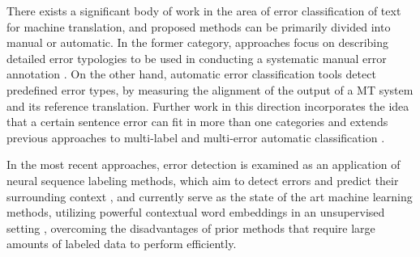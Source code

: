 
There exists a significant body of work in the area of error classification of text for machine translation, and proposed methods can be primarily divided into manual or automatic. In the former category, approaches focus on describing detailed error typologies to be used in conducting a systematic manual error annotation \cite{fishel2011automatic,vilar2006error, lommel2014multidimensional, farrus2010linguistic, costa2015linguistically}. On the other hand,  automatic error classification tools \cite{zeman2011addicter, popovic2011hjerson,popovic2015poor} detect predefined error types, by measuring the alignment of the output of a MT system and its reference translation. Further work in this direction incorporates the idea that a certain sentence error can fit in more than one categories \cite{klubivcka2018quantitative, lommel2014assessing} and extends previous approaches to multi-label and multi-error automatic classification \cite{popovic2019automatic}. 

In the most recent approaches, error detection is examined as an application of neural sequence labeling methods, which aim to detect errors and predict their surrounding context \cite{rei2017semi}, and currently serve as the state of the art machine learning methods, utilizing powerful contextual word embeddings in an unsupervised setting \cite{bell2019context}, overcoming the disadvantages of prior methods that require large amounts of labeled data to perform efficiently.
